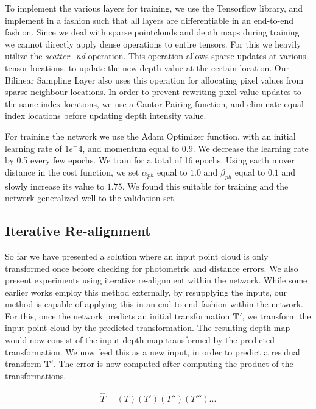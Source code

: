 \documentclass[letterpaper, 10 pt, conference]{ieeeconf}  %
\begin{document}
To implement the various layers for training, we use the Tensorflow library, and implement in a fashion such that all layers are differentiable in an end-to-end fashion. Since we deal with sparse pointclouds and depth maps during training we cannot directly apply dense operations to entire tensors. For this we heavily utilize the \textit{scatter\_nd} operation. This operation allows sparse updates at various tensor locations, to update the new depth value at the certain location. Our Bilinear Sampling Layer also uses this operation for allocating pixel values from sparse neighbour locations. In order to prevent rewriting pixel value updates to the same index locations, we use a Cantor Pairing function, and eliminate equal index locations before updating depth intensity value.  

For training the network we use the Adam Optimizer function, with an initial learning rate of $1e^-4$, and momentum equal to $0.9$. We decrease the learning rate by 0.5 every few epochs. We train for a total of 16 epochs. Using earth mover distance in the cost function, we set $\alpha_{ph}$ equal to $1.0$ and $\beta_{ph}$ equal to $0.1$ and slowly increase its value to $1.75$. We found this suitable for training and the network generalized well to the validation set. 

\subsection{Iterative Re-alignment}

So far we have presented a solution where an input point cloud is only transformed once before checking for photometric and distance errors. We also present experiments using iterative re-alignment within the network. While some earlier works employ this method externally, by resupplying the inputs, our method is capable of applying this in an end-to-end fashion within the network. For this, once the network predicts an initial transformation $\mathbf{T'}$, we transform the input point cloud by the predicted transformation. The resulting depth map would now consist of the input depth map transformed by the predicted transformation. We now feed this as a new input, in order to predict a residual transform $\mathbf{T'}$. The error is now computed after computing the product of the transformations. 

\begin{equation}
\begin{split}
    \widehat{T} = (T)(T')(T'')(T''')...
\end{split}
\end{equation} 
\end{document}
